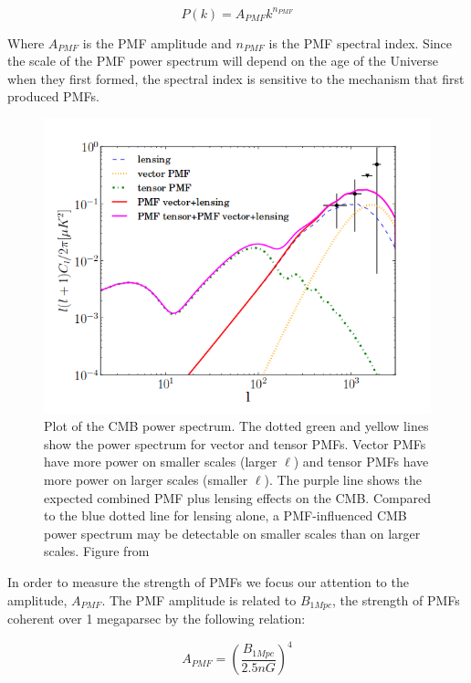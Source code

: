 \begin{equation}
\label{eqn:pmfpower}
P(k) = A_{PMF}k^{n_{PMF}}
\end{equation}

Where $A_{PMF}$ is the PMF amplitude and $n_{PMF}$ is the PMF spectral index. Since the scale of the PMF power spectrum will depend on the age of the Universe when they first formed, the spectral index is sensitive to the mechanism that first produced PMFs.

\begin{figure}[h]
\label{fig:pmfpower}
\centering
\includegraphics[scale=0.7]{images/PMFpower.png} 
\caption{Plot of the CMB power spectrum. The dotted green and yellow lines show the power spectrum for vector and tensor PMFs. Vector PMFs have more power on smaller scales (larger $\ell$) and tensor PMFs have more power on larger scales (smaller $\ell$). The purple line shows the expected combined PMF plus lensing effects on the CMB. Compared to the blue dotted line for lensing alone, a PMF-influenced CMB power spectrum may be detectable on smaller scales than on larger scales. Figure from \cite{Ade:2015cao}}
\end{figure}

In order to measure the strength of PMFs we focus our attention to the amplitude, $A_{PMF}$. The PMF amplitude is related to $B_{1Mpc}$, the strength of PMFs coherent over 1 megaparsec by the following relation:

\begin{equation}
\label{eqn:ab}
A_{PMF} = (\frac{B_{1Mpc}}{2.5nG})^4
\end{equation}

